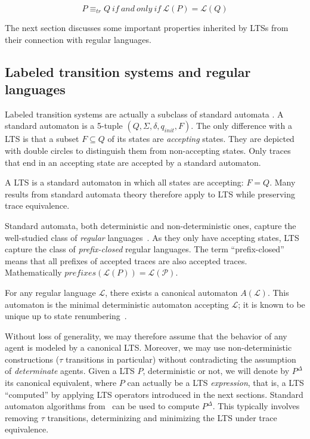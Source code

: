 \begin{equation}
P \equiv_{tr} Q~if~and~only~if~\mathcal{L}(P) = \mathcal{L}(Q)
\end{equation}

The next section discusses some important properties inherited by LTSs from their connection with regular languages. 

\subsection{Labeled transition systems and regular languages\label{section:background-lts-and-regular-languages}}

Labeled transition systems are actually a subclass of standard automata \cite{Hopcroft:1979}. A standard automaton is a 5-tuple $(Q,\Sigma,\delta,q_{init},F)$. The only difference with a LTS is that a subset $F \subseteq Q$ of its states are \emph{accepting} states. They are depicted with double circles to distinguish them from non-accepting states. Only traces that end in an accepting state are accepted by a standard automaton. 

A LTS is a standard automaton in which all states are accepting: $F = Q$. Many results from standard automata theory therefore apply to LTS while preserving trace equivalence.

Standard automata, both deterministic and non-deterministic ones, capture the well-studied class of \emph{regular} languages~\cite{Hopcroft:1979}. As they only have accepting states, LTS capture the class of \emph{prefix-closed} regular languages. The term ``prefix-closed'' means that all prefixes of accepted traces are also accepted traces. Mathematically $prefixes(\mathcal{L}(P)) = \mathcal{L(P)}$.

For any regular language $\mathcal{L}$, there exists a canonical automaton $A(\mathcal{L})$. This automaton is the minimal deterministic automaton accepting $\mathcal{L}$; it is known to be unique up to state renumbering~\cite{Gold:1978}. 

Without loss of generality, we may therefore assume that the behavior of any agent is modeled by a canonical LTS. Moreover, we may use non-deterministic constructions ($\tau$ transitions in particular) without contradicting the assumption of \emph{determinate} agents. Given a LTS $P$, deterministic or not, we will denote by $P^{\Delta}$ its canonical equivalent, where $P$ can actually be a LTS \emph{expression}, that is, a LTS ``computed'' by applying LTS operators introduced in the next sections. Standard automaton algorithms from~\cite{Hopcroft:1979} can be used to compute $P^\Delta$. This typically involves removing $\tau$ transitions, determinizing and minimizing the LTS under trace equivalence.

